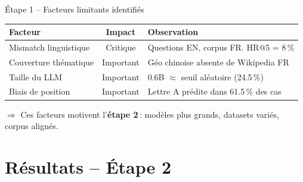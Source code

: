 \documentclass[aspectratio=169, 12pt]{beamer}
\begin{document}
\begin{frame}{\'Etape 1 -- Facteurs limitants identifi\'es}
  \begin{table}
    \centering
    \small
    \begin{tabular}{@{} l c p{7cm} @{}}
      \toprule
      \textbf{Facteur} & \textbf{Impact} & \textbf{Observation} \\
      \midrule
      \rowcolor{red!10}
      Mismatch linguistique & Critique & Questions EN, corpus FR. HR@5 = 8\,\% \\
      \rowcolor{orange!10}
      Couverture th\'ematique & Important & G\'eo chinoise absente de Wikipedia FR \\
      \rowcolor{orange!10}
      Taille du LLM & Important & 0.6B $\approx$ seuil al\'eatoire (24.5\,\%) \\
      \rowcolor{orange!10}
      Biais de position & Important & Lettre A pr\'edite dans 61.5\,\% des cas \\
      \bottomrule
    \end{tabular}
  \end{table}

  \vspace{0.4cm}

  \begin{center}
    $\Longrightarrow$ Ces facteurs motivent l'\textbf{\'etape 2}\,: mod\`eles plus grands, datasets vari\'es, corpus align\'es.
  \end{center}
\end{frame}

\section{R\'esultats -- \'Etape 2}
\end{document}

